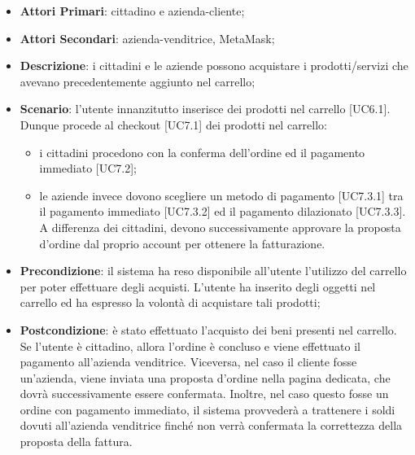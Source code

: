 \begin{itemize}
	\item \textbf{Attori Primari}: cittadino e azienda-cliente;
	\item \textbf{Attori Secondari}: azienda-venditrice, MetaMask\glo;
	\item \textbf{Descrizione}: i cittadini e le aziende possono acquistare i prodotti/servizi che avevano precedentemente aggiunto nel carrello;
	\item \textbf{Scenario}: l'utente innanzitutto inserisce dei prodotti nel carrello [UC6.1]. Dunque procede al checkout [UC7.1] dei prodotti nel carrello:
	\begin{itemize}
		\item i cittadini procedono con la conferma dell'ordine ed il pagamento immediato [UC7.2];
		\item le aziende invece dovono scegliere un metodo di pagamento [UC7.3.1] tra il pagamento immediato [UC7.3.2] ed il pagamento dilazionato [UC7.3.3]. A differenza dei cittadini, devono successivamente approvare la proposta d'ordine dal proprio account per ottenere la fatturazione.
	\end{itemize}
	
	\item \textbf{Precondizione}: il sistema ha reso disponibile all'utente l'utilizzo del carrello per poter effettuare degli acquisti. L'utente ha inserito degli oggetti nel carrello ed ha espresso la volontà di acquistare tali prodotti;
	\item \textbf{Postcondizione}: è stato effettuato l'acquisto dei beni presenti nel carrello. Se l'utente è cittadino, allora l'ordine è concluso e viene effettuato il pagamento all'azienda venditrice. Viceversa, nel caso il cliente fosse un'azienda, viene inviata una proposta d'ordine nella pagina dedicata, che dovrà successivamente essere confermata. Inoltre, nel caso questo fosse un ordine con pagamento immediato, il sistema provvederà a trattenere i soldi dovuti all'azienda venditrice finché non verrà confermata la correttezza della proposta della fattura.
\end{itemize} 
